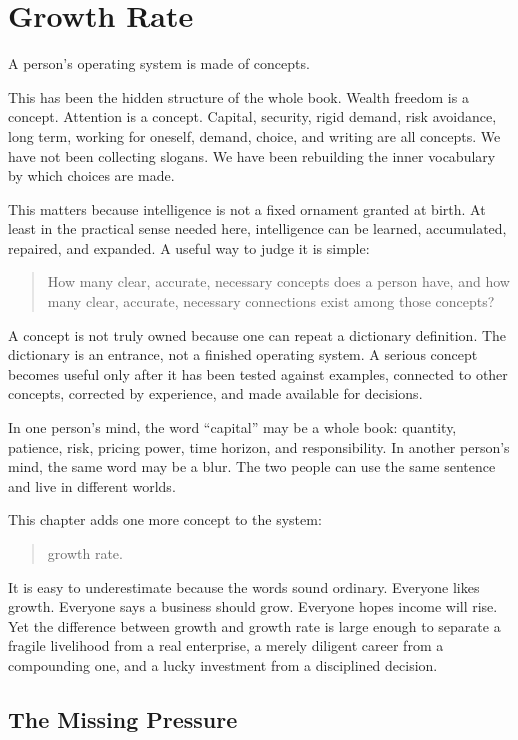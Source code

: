 \chapter{Growth Rate}

A person's operating system is made of concepts.

This has been the hidden structure of the whole book. Wealth freedom is a concept. Attention is a concept. Capital, security, rigid demand, risk avoidance, long term, working for oneself, demand, choice, and writing are all concepts. We have not been collecting slogans. We have been rebuilding the inner vocabulary by which choices are made.

This matters because intelligence is not a fixed ornament granted at birth. At least in the practical sense needed here, intelligence can be learned, accumulated, repaired, and expanded. A useful way to judge it is simple:

\begin{quote}
How many clear, accurate, necessary concepts does a person have, and how many clear, accurate, necessary connections exist among those concepts?
\end{quote}

A concept is not truly owned because one can repeat a dictionary definition. The dictionary is an entrance, not a finished operating system. A serious concept becomes useful only after it has been tested against examples, connected to other concepts, corrected by experience, and made available for decisions.

In one person's mind, the word ``capital'' may be a whole book: quantity, patience, risk, pricing power, time horizon, and responsibility. In another person's mind, the same word may be a blur. The two people can use the same sentence and live in different worlds.

This chapter adds one more concept to the system:

\begin{quote}
growth rate.
\end{quote}

It is easy to underestimate because the words sound ordinary. Everyone likes growth. Everyone says a business should grow. Everyone hopes income will rise. Yet the difference between growth and growth rate is large enough to separate a fragile livelihood from a real enterprise, a merely diligent career from a compounding one, and a lucky investment from a disciplined decision.

\section*{The Missing Pressure}

